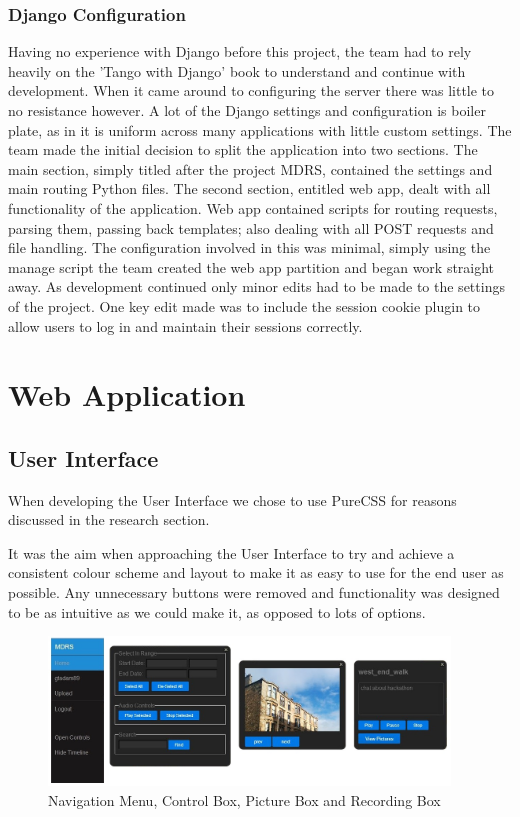 \documentclass{l3proj}
\begin{document}
\subsubsection{Django Configuration}
Having no experience with Django before this project, the team had to rely heavily on the 'Tango with Django' book to understand and continue with development. When it came around to configuring the server there was little to no resistance however. A lot of the Django settings and configuration is boiler plate, as in it is uniform across many applications with little custom settings.
The team made the initial decision to split the application into two sections. The main section, simply titled after the project MDRS, contained the settings and main routing Python files.
The second section, entitled web app, dealt with all functionality of the application. Web app contained scripts for routing requests, parsing them, passing back templates; also dealing with all POST requests and file handling.
The configuration involved in this was minimal, simply using the manage script the team created the web app partition and began work straight away.
As development continued only minor edits had to be made to the settings of the project. One key edit made was to include the session cookie plugin to allow users to log in and maintain their sessions correctly.

\section{Web Application}


\subsection{User Interface}

When developing the User Interface we chose to use PureCSS for reasons discussed in the research section.

It was the aim when approaching the User Interface to try and achieve a consistent colour scheme and layout to make it as easy to use for the end user as possible. Any unnecessary buttons were removed and functionality was designed to be as intuitive as we could make it, as opposed to lots of options.

\begin{figure}[ht!]
\centering
\includegraphics[width=0.95\textwidth]{images/ui-elements.jpg}
\caption{Navigation Menu, Control Box, Picture Box and Recording Box}
\end{figure}
\end{document}
